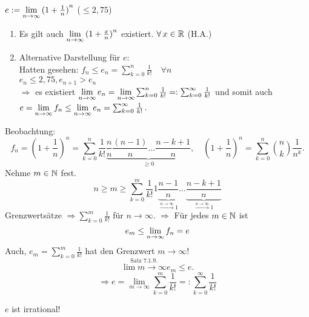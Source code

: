 \documentclass[../ana1.tex]{subfiles}
\begin{document}
\begin{defi}
	\( e:= \lim\limits_{n\rightarrow\infty} {(1+\frac{1}{n})}^n \) (\(\leq 2,75\))
\end{defi}
\begin{bem}\leavevmode
	\begin{enumerate}
		\item Es gilt auch \( \lim\limits_{n\rightarrow\infty} {(1+\frac{x}{n})}^n \) existiert. \( \forall x\in\R \) (H.A.)
		\item Alternative Darstellung für \(e\):\\
		Hatten gesehen: \(f_n \leq e_n = \sum_{k=0}^{n} \frac{1}{k!} \quad \forall n \) \\
		\(e_n \leq 2,75, e_{n+1} > e_n \) \\
		\( \Rightarrow \) es existiert \( \lim\limits_{n\rightarrow\infty} e_n = \lim\limits_{n\rightarrow\infty} \sum_{k=0}^{n} \frac{1}{k!} =: \sum_{k=0}^{\infty} \frac{1}{k!} \) und somit auch \(e = \lim\limits_{n\rightarrow\infty} f_n\leq \lim\limits_{n\rightarrow\infty} e_n = \sum_{k=0}^{\infty} \frac{1}{k!} \).
	\end{enumerate}
	Beobachtung: 
	\[ f_n = {\left(1+\frac{1}{n}\right)}^n = \sum_{k=0}^{n} \frac{1}{k!} \underbrace{\frac{n}{n}\frac{(n-1)}{n} \ldots\frac{n-k+1}{n}}_{\geq 0} , \quad {\left(1+\frac{1}{n}\right)}^n = \sum_{k=0}^{n} \binom{n}{k} \frac{1}{n^k}. \]
	Nehme \(m\in\mathbb{N} \) fest.
	\[ n\geq m \geq \sum_{k=0}^{m} \frac{1}{k!} 1 \underbrace{\frac{n-1}{n}}_{\overset{n\rightarrow\infty}{\rightarrow} 1} \ldots \underbrace{\frac{n-k+1}{n}}_{\overset{n\rightarrow\infty}{\rightarrow} 1} \]
	Grenzwertsätze \(\Rightarrow \sum_{k=0}^{m} \frac{1}{k!} \) für \(n\rightarrow\infty \).
	\( \Rightarrow \) Für jedes \(m\in\mathbb{N} \) ist
	\[e_m \leq \lim\limits_{n\rightarrow\infty} f_n = e \]
	Auch, \(e_m = \sum_{k=0}^{m} \frac{1}{k!} \) hat den Grenzwert \(m\rightarrow\infty \)!
	\[ \overset{\text{Satz 7.1.9.}}{\lim\limits{m\rightarrow\infty}} e_m \leq e. \]
	\[\Rightarrow e = \lim\limits_{m\rightarrow\infty} \sum_{k=0}^{m} \frac{1}{k!} =: \sum_{k=0}^{\infty} \frac{1}{k!} \]
\end{bem}
\begin{satz} 
	\(e\) ist irrational!
\end{satz}
\end{document}

